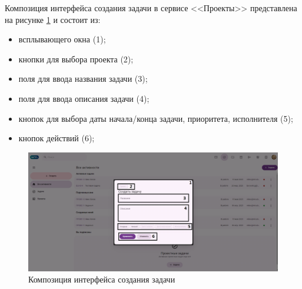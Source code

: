 Композиция интерфейса создания задачи в сервисе <<Проекты>> представлена на рисунке \ref{templ:image7c} и состоит из:
\begin{itemize}
  \item всплывающего окна (1);
  \item кнопки для выбора проекта (2);
  \item поля для ввода названия задачи (3);
  \item поля для ввода описания задачи (4);
  \item кнопок для выбора даты начала/конца задачи, приоритета, исполнителя (5);
  \item кнопок действий (6);
\end{itemize}
\begin{figure}[H]
	\centering
	\includegraphics[width=1\linewidth]{images/проекты3}
	\caption{Композиция интерфейса создания задачи}
	\label{templ:image7c}
\end{figure}

